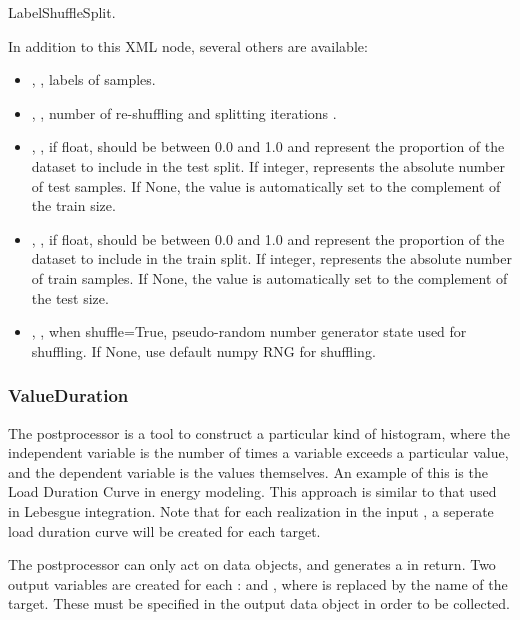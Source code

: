 LabelShuffleSplit.

In addition to this XML node, several others are available:
\begin{itemize}
  \item {}, , labels of samples.
  \item {}, , number of re-shuffling and splitting iterations
    .
  \item {}, , if float, should be between 0.0 and 1.0 and
    represent the proportion of the dataset to include in the test split. 
    If integer, represents the absolute number of test samples. If None, the value is automatically set to
    the complement of the train size.
  \item {}, , if float, should be between 0.0 and 1.0 and represent
    the proportion of the dataset to include in the train split. If integer, represents the absolute number of train
    samples. If None, the value is automatically set to the complement of the test size. 
  \item {}, , when shuffle=True,
    pseudo-random number generator state used for shuffling. If None, use default numpy RNG for shuffling.
\end{itemize}


\subsubsection{ValueDuration}
\label{ValueDurationPP}
The  postprocessor is a tool to construct a particular kind of histogram, where the
independent variable is the number of times a variable exceeds a particular value, and the dependent variable
is the values themselves.  An example of this is the Load Duration Curve in energy modeling. This approach is
similar to that used in Lebesgue integration. Note that for each realization in the input
, a seperate load duration curve will be created for each target.

The  postprocessor can only act on  data objects, and generates a
 in return.  Two output variables are created for each :
 and , where  is replaced by the name of the target.
These must be specified in the output data object in order to be collected.

